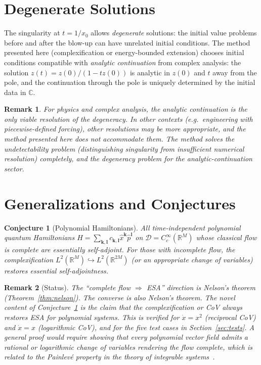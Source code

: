 \documentclass[11pt,a4paper]{article}
\newtheorem{remark}{Remark}
\newtheorem{conjecture}{Conjecture}
\newcommand{\Rset}{\mathbb{R}}
\newcommand{\Cset}{\mathbb{C}}
\newcommand{\Dom}{\mathcal{D}}
\begin{document}
\section{Degenerate Solutions}\label{sec:degenerate}

The singularity at $t=1/x_{0}$ allows \emph{degenerate} solutions: the
initial value problems before and after the blow-up can have unrelated
initial conditions.  The method presented here (complexification or
energy-bounded extension) chooses initial conditions compatible with
\emph{analytic continuation} from complex analysis: the solution
$z(t)=z(0)/(1-tz(0))$ is analytic in $z(0)$ and $t$ away from the pole,
and the continuation through the pole is uniquely determined by the
initial data in $\Cset$.

\begin{remark}
For physics and complex analysis, the analytic continuation is the only
viable resolution of the degeneracy.  In other contexts (e.g.\
engineering with piecewise-defined forcing), other resolutions may be
more appropriate, and the method presented here does not accommodate
them.  The method solves the \emph{undetectability} problem
(distinguishing singularity from insufficient numerical resolution)
completely, and the \emph{degeneracy} problem for the analytic-continuation
sector.
\end{remark}

\section{Generalizations and Conjectures}\label{sec:conjecture}

\begin{conjecture}[Polynomial Hamiltonians]\label{conj:poly}
All time-independent polynomial quantum Hamiltonians
$H=\sum_{\mathbf{k},\mathbf{l}}c_{\mathbf{k},\mathbf{l}}
\hat{x}^{\mathbf{k}}\hat{p}^{\mathbf{l}}$
on $\Dom=C^{\infty}_{c}(\Rset^{M})$ whose classical flow is complete are
essentially self-adjoint.  For those with incomplete flow, the
complexification $L^{2}(\Rset^{M})\hookrightarrow
L^{2}(\Rset^{2M})$ (or an appropriate change of variables) restores
essential self-adjointness.
\end{conjecture}

\begin{remark}[Status]
The ``complete flow $\Rightarrow$ ESA'' direction is Nelson's theorem
(Theorem~\ref{thm:nelson}).  The converse is also Nelson's theorem.  The
novel content of Conjecture~\ref{conj:poly} is the claim that the
complexification or CoV \emph{always} restores ESA for polynomial
systems.  This is verified for $\dot{x}=x^{2}$ (reciprocal CoV) and
$\dot{x}=x$ (logarithmic CoV), and for the five test cases in
Section~\ref{sec:tests}.  A general proof would require showing that
every polynomial vector field admits a rational or logarithmic change of
variables rendering the flow complete, which is related to the
Painlev\'e property in the theory of integrable
systems~\cite{GORIELY2000422}.
\end{remark}
\end{document}
